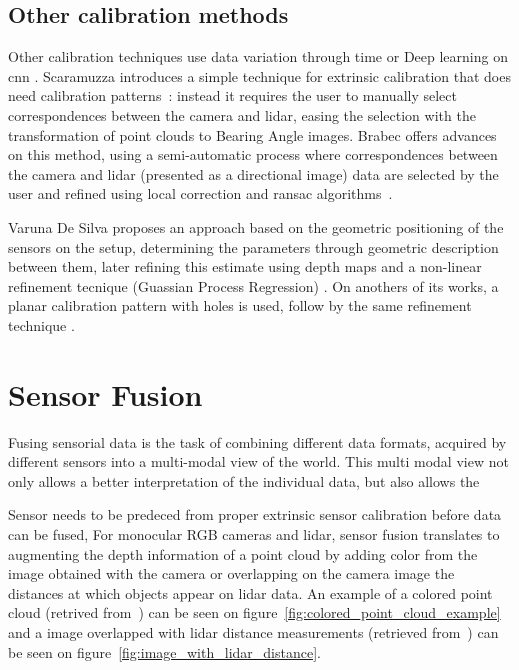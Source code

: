 \subsection{Other calibration methods}
Other calibration techniques use data variation through time \cite{Chien2017} or Deep learning on \ac{cnn} \cite{Wang2018a}. Scaramuzza \etal introduces a simple technique for extrinsic calibration that does need calibration patterns~\cite{Scaramuzza}: instead it requires the user to manually select correspondences between the camera and \ac{lidar}, easing the selection with the transformation of point clouds to Bearing Angle images. Brabec offers advances on this method, using a semi-automatic process where correspondences between the camera and \ac{lidar} (presented as a directional image) data are selected by the user and refined using local correction and \ac{ransac} algorithms~\cite{brabec2014}.


Varuna De Silva \etal proposes an approach based on the geometric positioning of the sensors on the setup, determining the parameters through geometric description between them, later refining this estimate using depth maps and a non-linear refinement tecnique (Guassian Process Regression) \cite{DeSilva2018}. On anothers of its works, a planar calibration pattern with holes is used, follow by the same refinement technique \cite{Silva2018}.


\section{Sensor Fusion}
Fusing sensorial data is the task of combining different data formats, acquired by different sensors  into a multi-modal view of the world. This multi modal view not only allows a better interpretation of the individual data, but also allows the 

Sensor needs to be predeced from proper extrinsic sensor calibration before data can be fused,
For monocular RGB cameras and \ac{lidar}, sensor fusion translates to augmenting the depth information of a point cloud by adding color from the image obtained with the camera or overlapping on the camera image the distances at which objects appear on \ac{lidar} data. An example of a colored point cloud (retrived from~\cite{Gong2013}) can be seen on figure~\ref{fig:colored_point_cloud_example} and a image overlapped with \ac{lidar} distance measurements (retrieved from~\cite{Bileschi2009}) can be seen on figure~\ref{fig:image_with_lidar_distance}.

